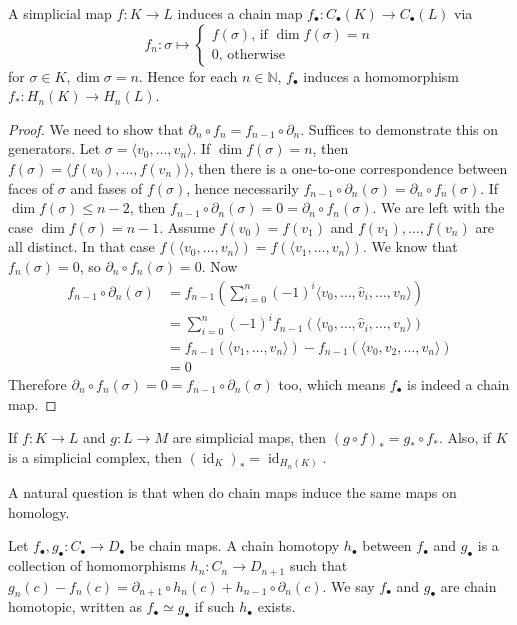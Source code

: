 \begin{lemma}
    A simplicial map $f:K\to L$ induces a chain map $f_\bullet:C_\bullet(K)\to C_\bullet(L)$ via
    $$f_n:\sigma\mapsto\begin{cases}
        f(\sigma)\text{, if $\dim f(\sigma)=n$}\\
        0\text{, otherwise}
    \end{cases}$$
    for $\sigma\in K,\dim\sigma=n$.
    Hence for each $n\in\mathbb N$, $f_\bullet$ induces a homomorphism $f_\ast:H_n(K)\to H_n(L)$.
\end{lemma}
\begin{proof}
    We need to show that $\partial_n\circ f_n=f_{n-1}\circ\partial_n$.
    Suffices to demonstrate this on generators.
    Let $\sigma=\langle v_0,\ldots,v_n\rangle$.
    If $\dim f(\sigma)=n$, then $f(\sigma)=\langle f(v_0),\ldots,f(v_n)\rangle$, then there is a one-to-one correspondence between faces of $\sigma$ and fases of $f(\sigma)$, hence necessarily $f_{n-1}\circ\partial_n(\sigma)=\partial_n\circ f_n(\sigma)$.
    If $\dim f(\sigma)\le n-2$, then $f_{n-1}\circ\partial_n(\sigma)=0=\partial_n\circ f_n(\sigma)$.
    We are left with the case $\dim f(\sigma)=n-1$.
    Assume $f(v_0)=f(v_1)$ and $f(v_1),\ldots,f(v_n)$ are all distinct.
    In that case $f(\langle v_0,\ldots,v_n\rangle)=f(\langle v_1,\ldots,v_n\rangle)$.
    We know that $f_n(\sigma)=0$, so $\partial_n\circ f_n(\sigma)=0$.
    Now
    \begin{align*}
        f_{n-1}\circ\partial_n(\sigma)&=f_{n-1}\left(\sum_{i=0}^n(-1)^i\langle v_0,\ldots,\hat{v}_i,\ldots,v_n\rangle\right)\\
        &=\sum_{i=0}^n(-1)^if_{n-1}(\langle v_0,\ldots,\hat{v}_i,\ldots,v_n\rangle)\\
        &=f_{n-1}(\langle v_1,\ldots,v_n\rangle)-f_{n-1}(\langle v_0,v_2,\ldots,v_n\rangle)\\
        &=0
    \end{align*}
    Therefore $\partial_n\circ f_n(\sigma)=0=f_{n-1}\circ\partial_n(\sigma)$ too, which means $f_\bullet$ is indeed a chain map.
\end{proof}
\begin{remark}
    If $f:K\to L$ and $g:L\to M$ are simplicial maps, then $(g\circ f)_\ast=g_\ast\circ f_\ast$.
    Also, if $K$ is a simplicial complex, then $(\operatorname{id}_K)_\ast=\operatorname{id}_{H_n(K)}$.
\end{remark}
A natural question is that when do chain maps induce the same maps on homology.
\begin{definition}
    Let $f_\bullet,g_\bullet:C_\bullet\to D_\bullet$ be chain maps.
    A chain homotopy $h_\bullet$ between $f_\bullet$ and $g_\bullet$ is a collection of homomorphisms $h_n:C_n\to D_{n+1}$ such that $g_n(c)-f_n(c)=\partial_{n+1}\circ h_n(c)+h_{n-1}\circ\partial_n(c)$.
    We say $f_\bullet$ and $g_\bullet$ are chain homotopic, written as $f_\bullet\simeq g_\bullet$ if such $h_\bullet$ exists.
\end{definition}
